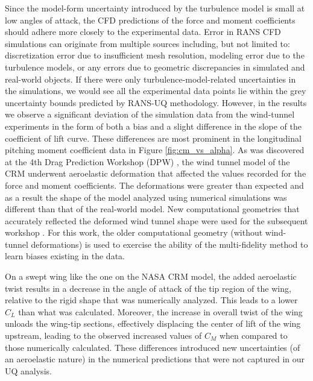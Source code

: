 Since the model-form uncertainty introduced by the turbulence model is small at low angles of attack, the CFD predictions of the force and moment coefficients should adhere more closely to the experimental data. 
Error in RANS CFD simulations can originate from multiple sources including, but not limited to: discretization error due to insufficient mesh resolution, modeling error due to the turbulence models, or any errors due to geometric discrepancies in simulated and real-world objects. If there were only turbulence-model-related uncertainties in the simulations, we would see all the experimental data points lie within the grey uncertainty bounds predicted by RANS-UQ methodology. However, in the results we observe a significant deviation of the simulation data from the wind-tunnel experiments in the form of both a bias and a slight difference in the slope of the coefficient of lift curve. These differences are most prominent in the longitudinal pitching moment coefficient data in Figure \ref{fig:cm_vs_alpha}. As was discovered at the 4th Drag Prediction Workshop (DPW) \cite{levy2013summary}, the wind tunnel model of the CRM underwent aeroelastic deformation that affected the values recorded for the force and moment coefficients. The deformations were greater than expected and as a result the shape of the model analyzed using numerical simulations was different than that of the real-world model. New computational geometries that accurately reflected the deformed wind tunnel shape were used for the subsequent workshop \cite{morrison20166th}. For this work, the older computational geometry (without wind-tunnel deformations) is used to exercise the ability of the multi-fidelity method to learn biases existing in the data. 

On a swept wing like the one on the NASA CRM model, the added aeroelastic twist results in a decrease in the angle of attack of the tip region of the wing, relative to the rigid shape that was numerically analyzed. This leads to a lower $C_L$ than what was calculated. Moreover, the increase in overall twist of the wing unloads the wing-tip sections, effectively displacing the center of lift of the wing upstream, leading to the observed increased values of $C_M$ when compared to those numerically calculated. These differences introduced new uncertainties (of an aeroelastic nature) in the numerical predictions that were not captured in our UQ analysis.  

